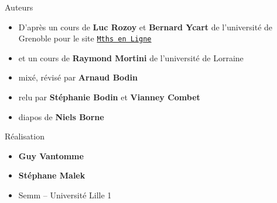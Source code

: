 \begin{frame}
\begin{minipage}{0.75\textwidth}
   \smallskip
   
  Auteurs
  \begin{itemize}
    \item D'après un cours de {\bf Luc Rozoy} et {\bf Bernard Ycart} de l'université de Grenoble
  pour le site \texttt{\href{http://ljk.imag.fr/membres/Bernard.Ycart/mel/}{M\at ths en Ligne}}
 
  \item et un cours de {\bf Raymond Mortini} de l'université de Lorraine

  \item mixé, révisé par {\bf Arnaud Bodin} 
  
  \item relu par {\bf Stéphanie Bodin} et {\bf Vianney Combet}
  
  \item  diapos de {\bf Niels Borne}
  
  
  \end{itemize}

  \smallskip

  Réalisation
  \begin{itemize}
    \item {\bf Guy Vantomme}
    \item {\bf Stéphane Malek} 
    \item Semm -- Université Lille 1
  \end{itemize}


  \end{minipage}  



\end{frame}


